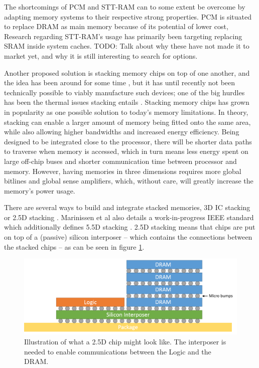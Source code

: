 The shortcomings of PCM and STT-RAM can to some extent be overcome by adapting memory systems to their respective strong properties. PCM is situated to replace DRAM as main memory because of its potential of lower cost, 
Research regarding STT-RAM's usage has primarily been targeting replacing SRAM inside system caches. 
TODO: Talk about why these have not made it to market yet, and why it is still interesting to search for options.
\bigskip

Another proposed solution is stacking memory chips on top of one another, and the idea has been around for some time \cite{lee2000three}\cite{jacob2005predicting}\cite{black2006stacking}, but it has until recently not been technically possible to viably manufacture such devices; one of the big hurdles has been the thermal issues stacking entails \cite{5074080}. Stacking memory chips has grown in popularity as one possible solution to today's memory limitations. In theory, stacking can enable a larger amount of memory being fitted onto the same area, while also allowing higher bandwidths and increased energy efficiency\cite{Lee:2016:SMA:2836331.2832911}. Being designed to be integrated close to the processor, there will be shorter data paths to traverse when memory is accessed, which in turn means less energy spent on large off-chip buses and shorter communication time between processor and memory. However, having memories in three dimensions requires more global bitlines and global sense amplifiers, which, without care, will greatly increase the memory's power usage.
\bigskip

There are several ways to build and integrate stacked memories, 3D IC stacking or 2.5D stacking \cite{6248905}\cite{5702702}\cite{6248842}. Marinissen et al also details a work-in-progress IEEE standard which additionally defines 5.5D stacking \cite{7519330}. 2.5D stacking means that chips are put on top of a (passive) silicon interposer -- which contains the connections between the stacked chips -- as can be seen in figure \ref{2D-chip}. 

\begin{figure}[!h]
\centering
\includegraphics[width=0.75\linewidth]{figure/2D-integration.png}
\caption{Illustration of what a 2.5D chip might look like. The interposer is needed to enable communications between the Logic and the DRAM. }
\label{2D-chip}
\end{figure}

